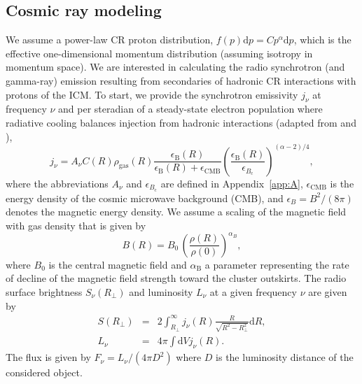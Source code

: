 \documentclass[traditabstract]{aa}
\newcommand{\rmn}{\mathrm}
\newcommand{\dd}{\mathrm{d}}
\begin{document}
\subsection{Cosmic ray modeling}
\label{sec:2.3}
We assume a power-law CR proton distribution, $f(p) \dd p=C p^\alpha \dd p$,
which is the effective one-dimensional momentum distribution (assuming isotropy
in momentum space). We are interested in calculating the radio synchrotron (and
gamma-ray) emission resulting from secondaries of hadronic CR interactions with
protons of the ICM. To start, we provide the synchrotron emissivity $j_{\nu}$ at
frequency $\nu$ and per steradian of a steady-state electron population where
radiative cooling balances injection from hadronic interactions (adapted from
\citealp{2008MNRAS.385.1211P} and \citealp{2011A&A...527A..99E}),
\begin{equation}
j_{\nu}  =  A_\nu C(R) \rho_{\rmn{gas}}(R) 
\frac{\epsilon_{\rmn{B}}(R)}{\epsilon_{\rmn{B}}(R)+\epsilon_{\rmn{CMB}}} 
\left( \frac{\epsilon_{\rmn{B}}(R)}{\epsilon_{B_{\rmn{c}}}} \right)^{(\alpha-2)/4},
\label{eq:jnu}
\end{equation}
where the abbreviations $A_\nu$ and $\epsilon_{B_{\rmn{c}}}$ are defined in
Appendix~\ref{app:A}, $\epsilon_{\rmn{CMB}}$ is the energy density of the cosmic
microwave background (CMB), and $\epsilon_B=B^{2}/(8\pi)$ denotes the magnetic
energy density. We assume a scaling of the magnetic field with gas density that
is given by
\begin{equation}
B(R) = B_0\,\left(\frac{\rho(R)}{\rho(0)}\right)^{\alpha_B},
\label{eq:B}
\end{equation}
where $B_0$ is the central magnetic field and $\alpha_{\rmn{B}}$ a parameter
representing the rate of decline of the magnetic field strength toward the
cluster outskirts. The radio surface brightness $S_{\nu}(R_{\perp})$ and luminosity
$L_{\nu}$ at a given frequency $\nu$ are given by
\begin{eqnarray}
S(R_{\perp}) &=& 2 \int_{R_{\perp}}^{\infty} j_{\nu}(R) \frac{R}{\sqrt{R^{2}-R_{\perp}^{2}}} \rmn{d}R, \\
L_{\nu}  &=&  4 \pi \int \dd V j_\nu(R).
\label{eq:lum}
\end{eqnarray}
The flux is given by $F_{\nu}=L_{\nu}/(4\pi D^{2})$ where $D$ is the
luminosity distance of the considered object.
\end{document}

